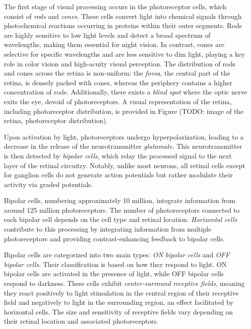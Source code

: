 The first stage of visual processing occurs in the photoreceptor cells, 
which consist of \emph{rods} and \emph{cones}. These cells convert light into 
chemical signals through photochemical reactions occurring in proteins within 
their outer segments. Rods are highly sensitive to low light levels and detect 
a broad spectrum of wavelengths, making them essential for night vision. 
In contrast, cones are selective for specific wavelengths and are less sensitive 
to dim light, playing a key role in color vision and high-acuity visual perception. 
The distribution of rods and cones across the retina is non-uniform: the \emph{fovea},
the central part of the retina, is densely packed with cones, whereas the periphery 
contains a higher concentration of rods. Additionally, there exists a \emph{blind spot} 
where the optic nerve exits the eye, devoid of photoreceptors. A visual representation 
of the retina, including photoreceptor distribution, is provided in Figure 
(TODO: image of the retina, photoreceptor distribution).

Upon activation by light, photoreceptors undergo hyperpolarization, leading to a decrease 
in the release of the neurotransmitter \emph{glutamate}. This neurotransmitter is then 
detected by \emph{bipolar cells}, which relay the processed signal to the next layer of the 
retinal circuitry. Notably, unlike most neurons, all retinal cells except for ganglion 
cells do not generate action potentials but rather modulate their activity via graded potentials.

Bipolar cells, numbering approximately 10 million, integrate information from around 
125 million photoreceptors. The number of photoreceptors connected to each bipolar 
cell depends on the cell type and retinal location. \emph{Horizontal cells} contribute 
to this processing by integrating information from multiple photoreceptors and 
providing contrast-enhancing feedback to bipolar cells.

Bipolar cells are categorized into two main types: \emph{ON bipolar cells} 
and \emph{OFF bipolar cells}. Their classification is based on how they 
respond to light. ON bipolar cells are activated in the presence of light, 
while OFF bipolar cells respond to darkness. These cells exhibit 
\emph{center-surround receptive fields}, meaning they react positively to light 
stimulation in the central region of their receptive field and negatively to 
light in the surrounding region, an effect facilitated by horizontal cells. 
The size and sensitivity of receptive fields vary depending on their retinal 
location and associated photoreceptors.

